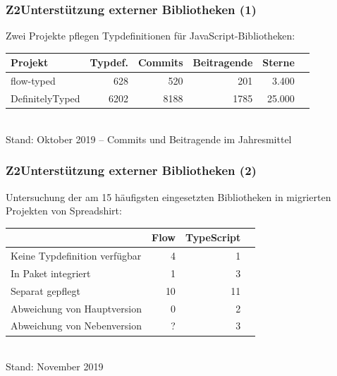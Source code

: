      \begin{frame}
        \frametitle{Z2\hspace{0.75em}Unterstützung externer Bibliotheken (1)}
        Zwei Projekte pflegen Typdefinitionen für JavaScript-Bibliotheken:\\[1.5em]
        {
          \footnotesize
          \begin{tabu} to 
            \midrule
            \rowfont{\bfseries} Projekt & Typdef. & Commits & Beitragende & Sterne & {} \\
            \midrule
            flow-typed      &  628 &  520 &  201 &  3.400 & \autocite{FLOW_TYPED} \\
            DefinitelyTyped & 6202 & 8188 & 1785 & 25.000 & \autocite{DEFINITELY_TYPED} \\
            \midrule
          \end{tabu}
          \\[1em]
          Stand: Oktober 2019 -- Commits und Beitragende im Jahresmittel
        }
      \end{frame}

      \begin{frame}
        \frametitle{Z2\hspace{0.75em}Unterstützung externer Bibliotheken (2)}
        Untersuchung der am 15 häufigsten eingesetzten Bibliotheken in migrierten Projekten von Spreadshirt:\\[1.5em]

        {
          \footnotesize
          \begin{tabu} to 
            \midrule
            \rowfont{\bfseries}  {} & Flow & TypeScript \\
            \midrule
            Keine Typdefinition verfügbar &  4 &  1 \\
            In Paket integriert           &  1 &  3 \\
            Separat gepflegt              & 10 & 11 \\
            \midrule
            Abweichung von Hauptversion   &  0 &  2 \\
            Abweichung von Nebenversion   &  ? &  3 \\
            \midrule
          \end{tabu}
          \\[1em]
          Stand: November 2019
        }

      \end{frame}

